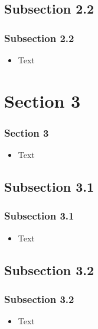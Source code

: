 \documentclass{beamer}
\begin{document}
\subsection{Subsection 2.2}
\begin{frame}
\frametitle{Subsection 2.2}
  \begin{itemize}
    \item Text
  \end{itemize}
\end{frame}



\section{Section 3}

\begin{frame}
\frametitle{Section 3}
  \begin{itemize}
    \item Text
  \end{itemize}
\end{frame}


\subsection{Subsection 3.1}
\begin{frame}
\frametitle{Subsection 3.1}
  \begin{itemize}
    \item Text
  \end{itemize}
\end{frame}



\subsection{Subsection 3.2}
\begin{frame}
\frametitle{Subsection 3.2}
  \begin{itemize}
    \item Text
  \end{itemize}
\end{frame}
\end{document}
